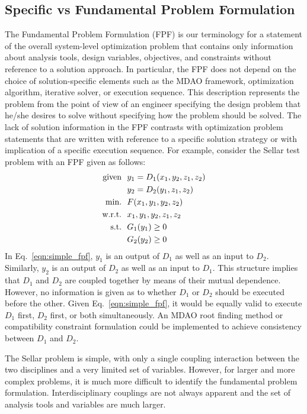 \subsection{Specific vs Fundamental Problem Formulation }
	\label{s:specific vs fundamental}
    The Fundamental Problem Formulation (FPF) is our terminology for a statement of the overall system-level optimization problem that contains only  information about analysis tools, design variables, objectives, and constraints without reference to a solution approach.
In particular, the FPF does not depend on the choice of solution-specific elements such as the MDAO framework, optimization algorithm, iterative solver, or execution sequence.
This description represents  the problem from the point of view of an engineer specifying the design problem that he/she desires to solve without specifying how the problem should be solved.
The lack of solution information in the FPF contrasts with optimization problem statements that are written with reference to a specific solution strategy or with implication of a specific execution sequence.
For example, consider the Sellar test problem \cite{AIAA:sellar} with an FPF given as follows:
    \begin{align}
        \textrm{given} & \ \ y_1 = D_1(x_1,y_2,z_1,z_2) \notag
        \\      & \ \ y_2 = D_2(y_1,z_1,z_2) \notag
        \\\textrm{min.} &\ \ F(x_1,y_1,y_2,z_2) \notag
        \\\textrm{w.r.t.} & \ \ x_1,y_1,y_2,z_1,z_2 \notag
        \\\textrm{s.t.} & \ \ G_1(y_1) \geq 0 \notag
        \\     & \ \ G_2(y_2) \geq 0
        \label{eqn:simple_fpf}
    \end{align}
    In Eq.~\ref{eqn:simple_fpf}, $y_1$ is an output of $D_1$ as well as an input
    to $D_2$. Similarly, $y_2$ is an output of $D_2$ as well as an input
    to $D_1$. This structure implies that $D_1$ and $D_2$ are coupled together by means
    of their mutual dependence. However, no information is given as to whether
    $D_1$ or $D_2$ should be executed before the other. Given Eq.~\ref{eqn:simple_fpf},
    it would be equally valid to execute $D_1$ first, $D_2$ first, or both simultaneously.
An MDAO root finding method or compatibility constraint formulation could be implemented to achieve consistency between $D_1$ and $D_2$.

    The Sellar problem is simple, with only a single coupling interaction
    between the two disciplines and a very limited set of variables.
 However, for larger and more complex problems,
    it is much more difficult to identify the fundamental problem formulation. Interdisciplinary
    couplings are not always apparent and the set of analysis tools and variables are
    much larger.

